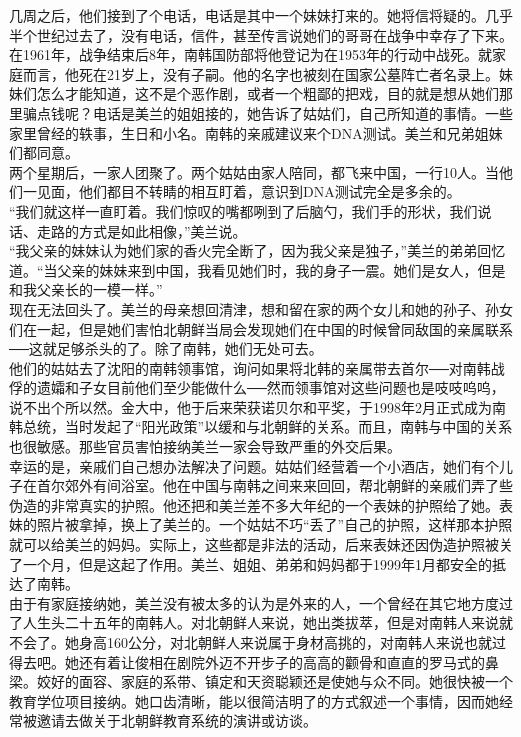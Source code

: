 几周之后，他们接到了个电话，电话是其中一个妹妹打来的。她将信将疑的。几乎半个世纪过去了，没有电话，信件，甚至传言说她们的哥哥在战争中幸存了下来。在1961年，战争结束后8年，南韩国防部将他登记为在1953年的行动中战死。就家庭而言，他死在21岁上，没有子嗣。他的名字也被刻在国家公墓阵亡者名录上。妹妹们怎么才能知道，这不是个恶作剧，或者一个粗鄙的把戏，目的就是想从她们那里骗点钱呢？电话是美兰的姐姐接的，她告诉了姑姑们，自己所知道的事情。一些家里曾经的轶事，生日和小名。南韩的亲戚建议来个DNA测试。美兰和兄弟姐妹们都同意。\\

两个星期后，一家人团聚了。两个姑姑由家人陪同，都飞来中国，一行10人。当他们一见面，他们都目不转睛的相互盯着，意识到DNA测试完全是多余的。\\

“我们就这样一直盯着。我们惊叹的嘴都咧到了后脑勺，我们手的形状，我们说话、走路的方式是如此相像，”美兰说。\\

“我父亲的妹妹认为她们家的香火完全断了，因为我父亲是独子，”美兰的弟弟回忆道。“当父亲的妹妹来到中国，我看见她们时，我的身子一震。她们是女人，但是和我父亲长的一模一样。”\\

现在无法回头了。美兰的母亲想回清津，想和留在家的两个女儿和她的孙子、孙女们在一起，但是她们害怕北朝鲜当局会发现她们在中国的时候曾同敌国的亲属联系──这就足够杀头的了。除了南韩，她们无处可去。\\

他们的姑姑去了沈阳的南韩领事馆，询问如果将北韩的亲属带去首尔──对南韩战俘的遗孀和子女目前他们至少能做什么──然而领事馆对这些问题也是吱吱呜呜，说不出个所以然。金大中，他于后来荣获诺贝尔和平奖，于1998年2月正式成为南韩总统，当时发起了“阳光政策”以缓和与北朝鲜的关系。而且，南韩与中国的关系也很敏感。那些官员害怕接纳美兰一家会导致严重的外交后果。\\

幸运的是，亲戚们自己想办法解决了问题。姑姑们经营着一个小酒店，她们有个儿子在首尔郊外有间浴室。他在中国与南韩之间来来回回，帮北朝鲜的亲戚们弄了些伪造的非常真实的护照。他还把和美兰差不多大年纪的一个表妹的护照给了她。表妹的照片被拿掉，换上了美兰的。一个姑姑不巧“丢了”自己的护照，这样那本护照就可以给美兰的妈妈。实际上，这些都是非法的活动，后来表妹还因伪造护照被关了一个月，但是这起了作用。美兰、姐姐、弟弟和妈妈都于1999年1月都安全的抵达了南韩。\\

由于有家庭接纳她，美兰没有被太多的认为是外来的人，一个曾经在其它地方度过了人生头二十五年的南韩人。对北朝鲜人来说，她出类拔萃，但是对南韩人来说就不会了。她身高160公分，对北朝鲜人来说属于身材高挑的，对南韩人来说也就过得去吧。她还有着让俊相在剧院外迈不开步子的高高的颧骨和直直的罗马式的鼻梁。姣好的面容、家庭的系带、镇定和天资聪颖还是使她与众不同。她很快被一个教育学位项目接纳。她口齿清晰，能以很简洁明了的方式叙述一个事情，因而她经常被邀请去做关于北朝鲜教育系统的演讲或访谈。\\

